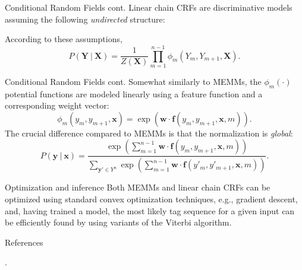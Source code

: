 \documentclass[style=upen, size=14pt]{powerdot}
\theoremstyle{definition}
\begin{document}
  \begin{slide}[toc=]{Conditional Random Fields cont.}
    Linear chain CRFs are discriminative models assuming the following
    \emph{undirected} structure:
    \begin{center}
    \end{center}
    According to these assumptions,
    $$
    P(\mathbf{Y}~|~\mathbf{X}) = \frac{1}{Z(\mathbf{X})}\prod_{m=1}^{n-1} \phi_{m}(Y_m, Y_{m+1}, \mathbf{X}).
    $$
  \end{slide}

  \begin{slide}[toc=]{Conditional Random Fields cont.}
    Somewhat similarly to MEMMs, the $\phi_m(\cdot)$ potential functions are
    modeled linearly using a feature function and a corresponding weight vector:
    $$
    \phi_m(y_m, y_{m+1},\mathbf{x})={\exp (\mathbf{w} \cdot
      \mathbf{f}(y_m,y_{m+1}, \mathbf{x}, m))}.
    $$
    The crucial difference compared to MEMMs is that the normalization is \emph{global}:
    $$
    P(\mathbf{y}~|~\mathbf{x}) =
    \frac{\exp(\sum_{m=1}^{n-1}\mathbf{w}\cdot\mathbf{f}(y_m,y_{m+1}, \mathbf{x}, m))}
    {\sum_{\mathbf{y}'\in Y^n}\exp(\sum_{m=1}^{n-1}\mathbf{w}\cdot\mathbf{f}(y'_m,y'_{m+1}, \mathbf{x}, m))}.
    $$
    
  \end{slide}

  \begin{slide}[toc={Optimization and inference}]{Optimization and inference}
    Both MEMMs and linear chain CRFs can be optimized using standard convex
    optimization techniques, e.g., gradient descent, and, having trained a
    model, the most likely tag sequence for a given input can be efficiently
    found by using variants of the Viterbi algorithm.
  \end{slide}

  \begin{slide}{References}
    
    \begin{footnotesize}

      .\medskip
      
    \end{footnotesize}
  \end{slide}
\end{document}
